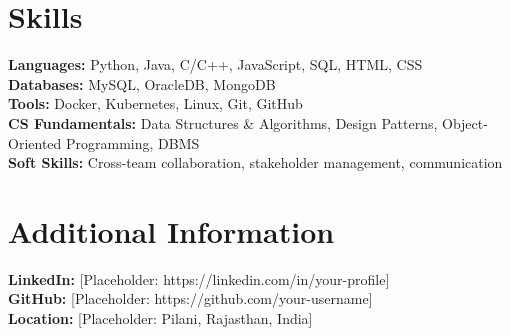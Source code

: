 \documentclass[11pt,a4paper]{article}
\begin{document}
\section*{Skills}
\textbf{Languages:} Python, Java, C/C++, JavaScript, SQL, HTML, CSS\\
\textbf{Databases:} MySQL, OracleDB, MongoDB\\
\textbf{Tools:} Docker, Kubernetes, Linux, Git, GitHub\\
\textbf{CS Fundamentals:} Data Structures \& Algorithms, Design Patterns, Object-Oriented Programming, DBMS\\
\textbf{Soft Skills:} Cross-team collaboration, stakeholder management, communication

\section*{Additional Information}
\textbf{LinkedIn:} [Placeholder: https://linkedin.com/in/your-profile]\\
\textbf{GitHub:} [Placeholder: https://github.com/your-username]\\
\textbf{Location:} [Placeholder: Pilani, Rajasthan, India]
\end{document}
